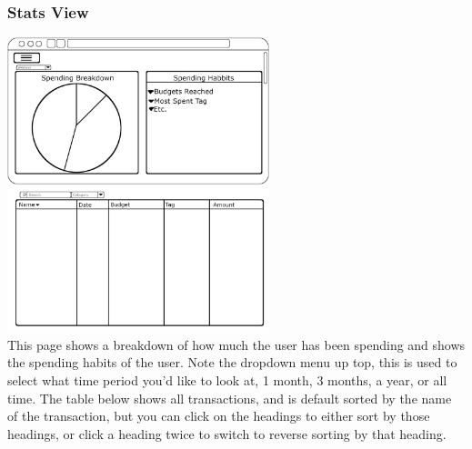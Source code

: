 \documentclass[12pt]{article}
\begin{document}
\subsubsection{Stats View}
\includegraphics[width=3in]{StatsPage.png}\\
This page shows a breakdown of how much the user has been spending and shows the spending habits of the user. Note the dropdown menu up top, this is used to select what time period you'd like to look at, 1 month, 3 months, a year, or all time. The table below shows all transactions, and is default sorted by the name of the transaction, but you can click on the headings to either sort by those headings, or click a heading twice to switch to reverse sorting by that heading.\\
\end{document}

